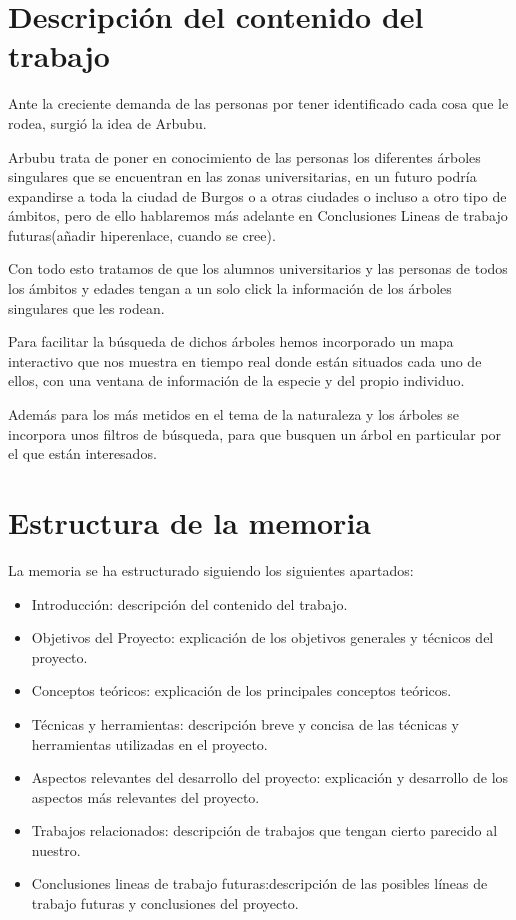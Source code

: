 
\section{Descripción del contenido del trabajo}
Ante la creciente demanda de las personas por tener identificado cada cosa que le rodea, surgió la idea de Arbubu.

Arbubu trata de poner en conocimiento de las personas los diferentes árboles singulares que se encuentran en las zonas universitarias, en un futuro podría expandirse a toda la ciudad de Burgos o a otras ciudades o incluso a otro tipo de ámbitos, pero de ello hablaremos más adelante en Conclusiones Lineas de trabajo futuras(añadir hiperenlace, cuando se cree).

Con todo esto tratamos de que los alumnos universitarios y las personas de todos los ámbitos y edades tengan a un solo click la información de los árboles singulares que les rodean.

Para facilitar la búsqueda de dichos árboles hemos incorporado un mapa interactivo que nos muestra en tiempo real donde están situados cada uno de ellos, con una ventana de información de la especie y del propio individuo.

Además para los más metidos en el tema de la naturaleza y los árboles se incorpora unos filtros de búsqueda, para que busquen un árbol en particular por el que están interesados.


\section{Estructura de la memoria}
La memoria se ha estructurado siguiendo los siguientes apartados:
\begin{itemize}
	\item Introducción: descripción del contenido del trabajo.
	\item Objetivos del Proyecto: explicación de los objetivos generales y técnicos del proyecto.
	\item Conceptos teóricos: explicación de los principales conceptos teóricos.
	\item Técnicas y herramientas: descripción breve y concisa de las técnicas y herramientas utilizadas en el proyecto.
	\item Aspectos relevantes del desarrollo del proyecto: explicación y desarrollo de los aspectos más relevantes del proyecto.
	\item Trabajos relacionados: descripción de trabajos que tengan cierto parecido al nuestro.
	\item Conclusiones lineas de trabajo futuras:descripción de las posibles líneas de trabajo futuras y conclusiones del proyecto.
\end{itemize}


